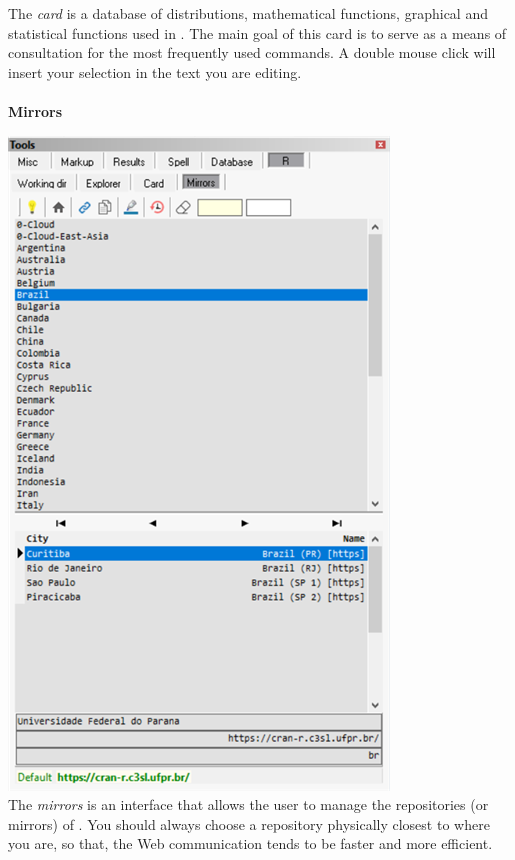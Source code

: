 The \textit{card} is a database of distributions, mathematical functions, graphical and statistical functions used in \RR{}.
The main goal of this card is to serve as a means of consultation for the most frequently used commands.
A double mouse click will insert your selection in the text you are editing.

\newpage
\paragraph{}\textbf{Mirrors}\\

\includegraphics[scale=0.50]{./res/tools_r_mirrors.png} \\

The \textit{mirrors} is an interface that allows the user to manage the repositories (or mirrors) of \RR{}.
You should always choose a repository physically closest to where you are,
so that, the Web communication tends to be faster and more efficient.


